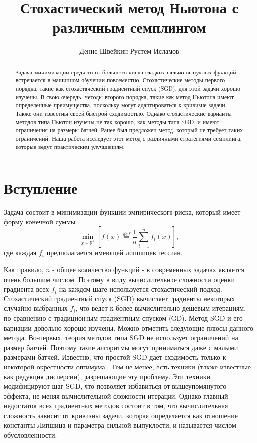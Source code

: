 \documentclass{article}
\title{Стохастический метод Ньютона с различным семплингом}
\author{Денис Швейкин
	\And
	Рустем Исламов
}
\date{}
\theoremstyle{definition}
\theoremstyle{assumption}
\theoremstyle{lemma}
\theoremstyle{theorem}
\theoremstyle{proposition}
\begin{document}
	
	\maketitle
	
	\begin{abstract}
		
		Задача минимизации среднего от большого числа гладких сильно выпуклых функций встречается в машинном обучении повсеместно. Стохастические методы первого порядка, такие как стохастический градиентный спуск (SGD), для этой задачи хорошо изучены. В свою очередь, методы второго порядка, такие как метод Ньютона имеют определенные преимущества, поскольку могут адаптироваться к кривизне задачи. Также они известны своей быстрой сходимостью. Однако стохастические варианты методов типа Ньютон изучены не так хорошо, как методы типа SGD, и имеют ограничения на размеры батчей. Ранее был предложен метод, который не требует таких ограничений. Наша работа исследует этот метод с различными стратегиями семплинга, которые ведут практическим улучшениям.
		
	\end{abstract}
	
	
	
	\section{Вступление}
	
	Задача состоит в минимизации функции эмпирического риска, который имеет форму конечной суммы \cite{kovalev2019stochastic}:
	\begin{equation}\label{ERM}
		\underset{x \in \mathbb R^d}{\min} \left[ f(x) \overset{def}{=} \frac{1}{n} \sum \limits_{i=1}^n f_i(x) \right],
	\end{equation}
	где каждая $f_i$ предполагается имеющей липшицев гессиан. 
	
	Как правило, $n$ - общее количество функций - в современных задачах является очень большим числом. Поэтому в виду вычислительное сложности оценки градиента всех $f_i$ на каждом шаге используется стохастический подход. Стохастический градиентный спуск (SGD) \cite{SGD-1} вычисляет градиенты некоторых случайно выбранных $f_i$, что ведет к более вычислительно дешевым итерациям, по сравнению с традиционным градиентным спуском (GD). Метод SGD и его вариации довольно хорошо изучены. Можно отметить следующие плюсы данного метода. Во-первых, теория методов типа SGD не использует ограничений на размер батчей. Поэтому такие алгоритмы могут приниматься даже с малыми размерами батчей. Известно, что простой SGD дает сходимость только к некоторой окрестности оптимума \cite{sgd-hogwild, sgd-general-analysis}. Тем не менее, есть техники (также известные как редукция дисперсии), разрешающие эту проблему. Эти техники \cite{exp-convergence, advances-NIPS, unified-sgd, one-method} модифицируют шаг SGD, что позволяет избавиться от вышеупомянутого эффекта, не меняя вычислительной сложности итерации. Однако главный недостаток всех градиентных методов состоит в том, что вычислительная сложность зависит от кривизны задачи, которая определяется как отношение константы Липшица и параметра сильной выпуклости, и называется числом обусловленности.
	
\end{document}
